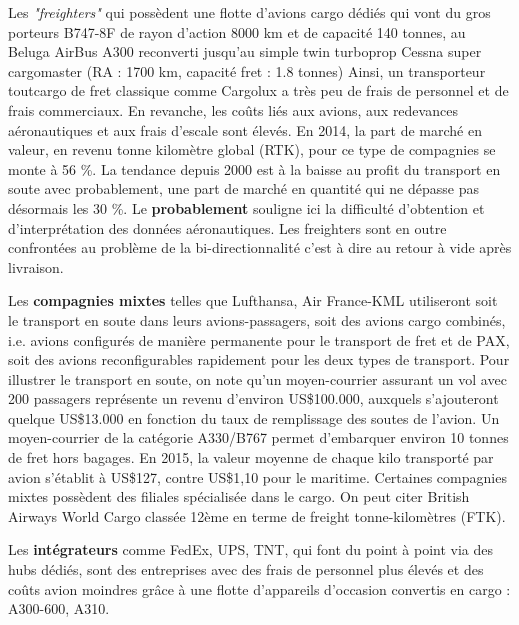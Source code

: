 Les \textit {"freighters"} qui possèdent une flotte d'avions cargo dédiés qui vont du gros porteurs B747-8F de rayon d'action 8000 km et de capacité 140 tonnes, au Beluga AirBus A300 reconverti jusqu'au simple twin turboprop Cessna super cargomaster (RA : 1700 km, capacité fret : 1.8 tonnes) Ainsi, un transporteur tout\-cargo de fret classique comme Cargolux a très peu de frais de personnel et de frais commerciaux. En revanche, les coûts liés aux avions, aux redevances aéronautiques et aux frais d’escale sont élevés. En 2014, la part de marché en valeur, en revenu tonne kilomètre global (RTK), pour ce type de compagnies se monte à 56 \%. La tendance depuis 2000 est à la baisse au profit du transport en soute avec probablement, une part de marché en quantité qui ne dépasse pas désormais les 30 \%. Le \textbf{probablement} souligne ici la difficulté d'obtention et d'interprétation des données aéronautiques. Les freighters sont en outre confrontées au problème de la bi-directionnalité c'est à dire au retour à vide après livraison. 
	
Les \textbf{compagnies mixtes} telles que Lufthansa, Air France-KML utiliseront soit le transport en soute dans leurs avions-passagers, soit des avions cargo combinés, i.e. avions configurés de manière permanente pour le transport de fret et de PAX, soit des avions reconfigurables rapidement pour les deux types de transport. Pour illustrer le transport en soute, on note qu'un moyen-courrier assurant un vol avec 200 passagers représente un revenu d’environ US\$100.000, auxquels s’ajouteront quelque US\$13.000 en fonction du taux de remplissage des soutes de l’avion. Un moyen-courrier de la catégorie A330/B767 permet d’embarquer environ 10 tonnes de fret hors bagages. En 2015, la valeur moyenne de chaque kilo transporté par avion s’établit à US\$127, contre US\$1,10 pour le maritime.
Certaines compagnies mixtes possèdent des filiales spécialisée dans le cargo. On peut citer British Airways World Cargo classée 12ème en terme de freight tonne-kilomètres (FTK).
	
Les \textbf{intégrateurs} comme FedEx, UPS, TNT, qui font du point à point via des hubs dédiés, sont des entreprises avec des frais de personnel plus élevés et des coûts avion moindres grâce à une flotte d'appareils d’occasion convertis en cargo : A300-600, A310. \cite{lantenne}


